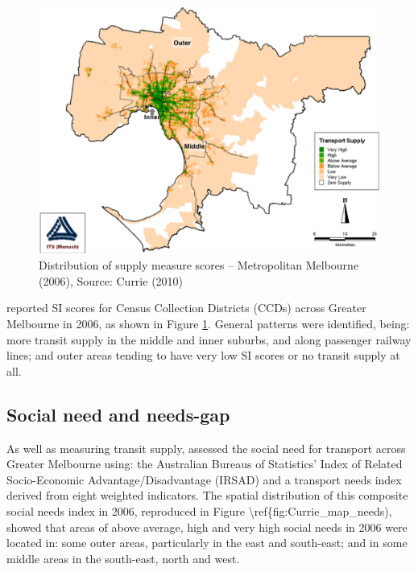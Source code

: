 \documentclass[preprint, 3p,
authoryear]{elsarticle} %
\begin{document}
\begin{figure}
\includegraphics[width=1\linewidth]{graphics/Currie2010SI} \caption{Distribution of supply measure scores – Metropolitan Melbourne (2006), Source: Currie (2010)}\label{fig:Currie_map_SI}
\end{figure}

\citet{currie2010identifying} reported SI scores for Census Collection
Districts (CCDs) across Greater Melbourne in 2006, as shown in Figure
\ref{fig:Currie_map_SI}. General patterns were identified, being: more
transit supply in the middle and inner suburbs, and along passenger
railway lines; and outer areas tending to have very low SI scores or no
transit supply at all.

\subsection{Social need and needs-gap}\label{social-need-and-needs-gap}

As well as measuring transit supply, \citet{currie2010identifying}
assessed the social need for transport across Greater Melbourne using:
the Australian Bureaus of Statistics' Index of Related Socio-Economic
Advantage/Disadvantage (IRSAD) and a transport needs index derived from
eight weighted indicators. The spatial distribution of this composite
social needs index in 2006, reproduced in Figure
\textbackslash ref\{fig:Currie\_map\_needs), showed that areas of above
average, high and very high social needs in 2006 were located in: some
outer areas, particularly in the east and south-east; and in some middle
areas in the south-east, north and west.
\end{document}
